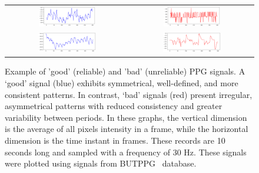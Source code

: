 \begin{figure}[h!]
    {
    \def\arraystretch{1}
    \setlength{\tabcolsep}{2pt}
    \begin{tabular}{cc}
        \includegraphics[width=0.48\textwidth, trim={1.5em 0 0em 0}, clip]{img/samples/butppg_111001.png} 
        & \includegraphics[width=0.48\textwidth, trim={1.5em 0 0em 0}, clip]{img/samples/butppg_111003.png} \\
        \includegraphics[width=0.49\textwidth, trim={1.5em 0 0em 0}, clip]{img/samples/butppg_111002.png} 
        & \includegraphics[width=0.49\textwidth, trim={1em 0 0em 0}, clip]{img/samples/butppg_111004.png} \\
    \end{tabular}
    }
    \caption{Example of 'good' (reliable) and 'bad' (unreliable) PPG signals. A `good' signal (blue) exhibits symmetrical, well-defined, and more consistent patterns. In contrast, `bad' signals (red) present irregular, asymmetrical patterns with reduced consistency and greater variability between periods. In these graphs, the vertical dimension is the average of all pixels intensity in a frame, while the horizontal dimension is the time instant in frames. These records are 10 seconds long and sampled with a frequency of 30 Hz. These signals were plotted using signals from BUTPPG~\protect\cite{butppg} database.}
    \label{fig:butppg_samples}
\end{figure}

